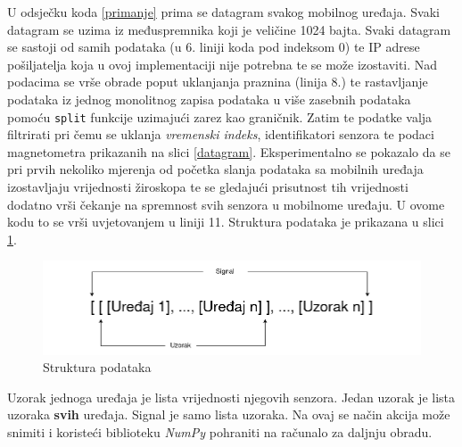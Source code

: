 \documentclass[times, utf8, diplomski]{fer}
\begin{document}
U odsječku koda \ref{primanje} prima se datagram svakog mobilnog uređaja. Svaki datagram se uzima iz međuspremnika koji je veličine 1024 bajta. Svaki datagram se sastoji
od samih podataka (u 6. liniji koda pod indeksom 0) te IP adrese pošiljatelja koja u ovoj implementaciji nije potrebna te se može izostaviti. Nad podacima se vrše obrade
poput uklanjanja praznina (linija 8.) te rastavljanje podataka iz jednog monolitnog zapisa podataka u više zasebnih podataka pomoću \texttt{split} funkcije uzimajući
zarez kao graničnik. Zatim te podatke valja filtrirati pri čemu se uklanja \textit{vremenski indeks}, identifikatori senzora te podaci magnetometra
prikazanih na slici \ref{datagram}. Eksperimentalno se pokazalo da se pri prvih nekoliko mjerenja od početka slanja podataka sa mobilnih uređaja izostavljaju vrijednosti
žiroskopa te se gledajući prisutnost tih vrijednosti dodatno vrši čekanje na spremnost svih senzora u mobilnome uređaju. U ovome kodu to se vrši uvjetovanjem u liniji 11.
Struktura podataka je prikazana u slici \ref{struktura}.

\begin{figure}[h]
    \includegraphics[width=\textwidth]{OrganizacijaPOdataka.png}
    \caption{Struktura podataka}
    \label{struktura}
\end{figure}

Uzorak jednoga uređaja je lista vrijednosti njegovih senzora. Jedan uzorak je lista uzoraka \textbf{svih} uređaja. Signal je samo lista uzoraka. Na ovaj se način akcija 
može snimiti i koristeći biblioteku \textit{NumPy} pohraniti na računalo za daljnju obradu.
\end{document}

